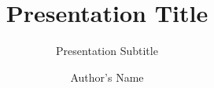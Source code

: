\documentclass{beamer}
\title{Presentation Title} %
\subtitle{Presentation Subtitle} %
\author{Author's Name}
\begin{document}
	\frame{\maketitle}
	
\end{document}
